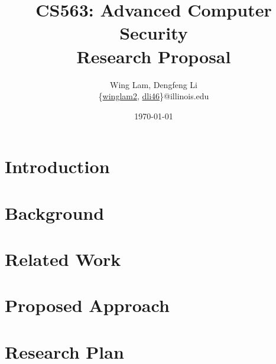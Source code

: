 \documentclass{article}
\title{\vspace{-3.0cm}CS563: Advanced Computer Security \\ Research Proposal}
\author{Wing Lam, Dengfeng Li \\
\{\href{mailto:winglam2@illinois.edu}{winglam2},
\href{mailto:dli46@illinois.edu}{dli46}\}@illinois.edu}
\date{\today}
\begin{document}
\maketitle

\begin{multicols}{2}

\begin{abstract}
\blindtext
\end{abstract}


\section{Introduction}

\label{introduction}

\section{Background}

\label{background}

\section{Related Work}

\label{related-work}

\section{Proposed Approach}

\label{proposed-approach}

\section{Research Plan}

\label{proposed-plan}

\printbibliography

\end{multicols}
\end{document}
